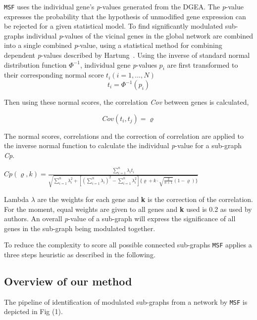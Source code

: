 \documentclass[twocolumn]{article}
\begin{document}
\texttt{MSF} uses the individual gene's \textit{p}-values generated
from the DGEA. The \textit{p}-value
expresses the probability that the hypothesis of unmodified gene
expression can be rejected for a given statistical model. To find
significantly modulated sub-graphs individual \textit{p}-values of the
vicinal genes in the global network are combined into a single
combined \textit{p}-value, using a statistical method for combining
dependent \textit{p}-values described by Hartung~\cite{Hartung}. Using the inverse of standard normal distribution function $\Phi^{-1}$, individual gene \textit{p}-values $p_i$ are
first transformed to their corresponding normal score $t_i(i=1,...,N)$
\[ t_i = \Phi^{-1}(p_i) \]  

Then using these normal scores, the correlation \textit{Cov} between genes is calculated, 

\[ Cov (t_i, t_j) =\varrho\]

The normal scores, correlations and the correction of correlation are applied to
the inverse normal function to calculate the individual
\textit{p}-value for a sub-graph \textit{Cp}. \newline

$  {\scriptstyle Cp(\varrho,k) = \frac{\sum_{i=1}^{n} \lambda_i t_i}{\sqrt{\sum_{i=1}^{n} \lambda_i^2 +[(\sum_{i=1}^{n} \lambda_i)^2- \sum_{i=1}^{n} \lambda_i^2]\{\varrho+k\cdot\sqrt{\frac{2}{n+1}} (1-\varrho)\}}}} $\\ \newline

Lambda $\lambda$ are the weights for each gene and \textbf{k} is the correction of the correlation. For the moment, equal weights are given to all genes and \textbf{k} used is 0.2 as used by authors. An
overall \textit{p}-value of a sub-graph will express the significance
of all genes in the sub-graph being modulated together.

To reduce the complexity to score all possible connected sub-graphs
\texttt{MSF} applies a three steps heuristic as described in the
following.\newline
 
\subsection*{Overview of our method}

The pipeline of identification of modulated sub-graphs from a network by \texttt{MSF} is depicted in
Fig (1).
\newline
\end{document}
